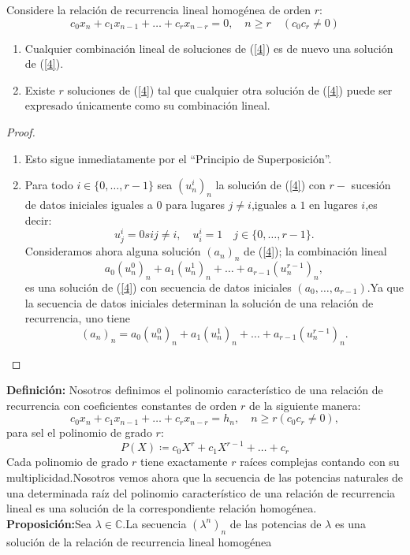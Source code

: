 Considere la relación de recurrencia lineal homogénea de orden $ r $:
\begin{equation}\label{4}
c_{0}x_{n}+c_{1}x_{n-1}+\ldots+c_{r}x_{n-r}=0,\quad n \geq r \quad (c_{0}c_{r} \neq 0)
\end{equation}
\begin{enumerate}
\item Cualquier combinación lineal de soluciones de (\ref{4}) es de nuevo una solución de (\ref{4}).
\item Existe $ r $ soluciones de (\ref{4}) tal que cualquier otra solución de (\ref{4}) puede ser expresado únicamente como su combinación lineal.
\end{enumerate}
\begin{proof}
\begin{enumerate}
\item  Esto sigue inmediatamente por el ``Principio de Superposición''.
\item Para todo $ i \in \{0,\ldots,r-1 \}$ sea $ (u^{i}_{n})_{n} $ la solución de (\ref{4}) con 
$ r - $ sucesión de datos iniciales iguales a $ 0$ para lugares $ j\neq i $,iguales a $ 1 $ en lugares $ i $,es decir:
$$
u^{i}_{j}=0 si j\neq i , \quad u^{i}_{i}=1 \quad  j \in \{0,\ldots,r-1 \}.
$$
Consideramos ahora  alguna solución $ (a_{n})_{n} $ de (\ref{4}); la combinación lineal 
$$
a_{0}(u^{0}_{n})_{n}+a_{1}(u^{1}_{n})_{n}+\ldots+a_{r-1}(u^{r-1}_{n})_{n},
$$
es una solución de (\ref{4}) con secuencia de datos iniciales $ (a_{0},\ldots,a_{r-1}) $.Ya que la secuencia de datos iniciales determinan la solución de una relación de recurrencia, uno tiene
$$
(a_{n})_{n}=a_{0}(u^{0}_{n})_{n}+a_{1}(u^{1}_{n})_{n}+\ldots+a_{r-1}(u^{r-1}_{n})_{n}.
$$
\end{enumerate}
\end{proof}
{\bf Definición:} Nosotros definimos el polinomio característico de una relación de recurrencia con coeficientes constantes de orden $ r $ de la siguiente manera:
$$
c_{0}x_{n}+c_{1}x_{n-1}+\ldots+c_{r}x_{n-r}=h_{n}, \quad n \geq r (c_{0}c_{r}\neq 0),
$$
para sel el polinomio de grado $ r $:
$$
P(X) \coloneq c_{0}X^{r}+c_{1}X^{r-1}+\ldots+c_{r}
$$
Cada polinomio de grado $ r $ tiene exactamente $ r $ raíces complejas contando con su multiplicidad.Nosotros vemos ahora que la secuencia de las potencias naturales de una determinada raíz del polinomio característico de una relación de recurrencia lineal es una solución de la correspondiente relación homogénea.\\
{\bf Proposición:}Sea $ \lambda \in  \mathbb{C} $.La secuencia $ (\lambda^{n})_{n} $ de las potencias de $ \lambda $ es una solución de la relación de recurrencia lineal homogénea
